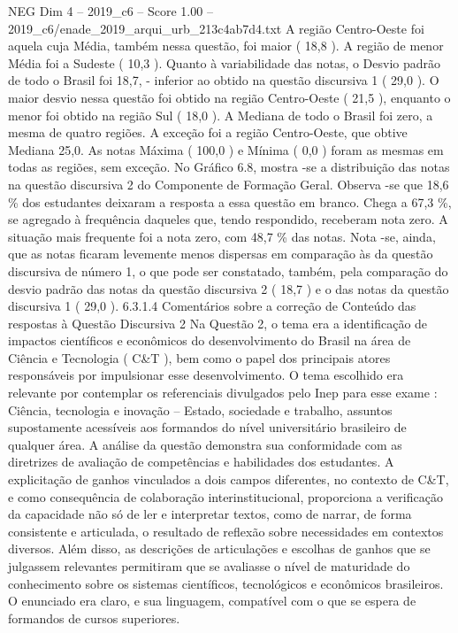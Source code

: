 \begin{textsample}{NEG Dim 4 – 2019\_c6 – Score 1.00 – 2019\_c6/enade\_2019\_arqui\_urb\_213c4ab7d4.txt}
A região Centro-Oeste foi aquela cuja Média, também nessa questão, foi maior ( 18,8 ).
A região de menor Média foi a Sudeste ( 10,3 ).
Quanto à variabilidade das notas, o Desvio padrão de todo o Brasil foi 18,7, - inferior ao obtido na questão discursiva 1 ( 29,0 ).
O maior desvio nessa questão foi obtido na região Centro-Oeste ( 21,5 ), enquanto o menor foi obtido na região Sul ( 18,0 ).
A Mediana de todo o Brasil foi zero, a mesma de quatro regiões.
A exceção foi a região Centro-Oeste, que obtive Mediana 25,0.
As notas Máxima ( 100,0 ) e Mínima ( 0,0 ) foram as mesmas em todas as regiões, sem exceção.
No Gráfico 6.8, mostra -se a distribuição das notas na questão discursiva 2 do Componente de Formação Geral.
Observa -se que 18,6 \% dos estudantes deixaram a resposta a essa questão em branco.
Chega a 67,3 \%, se agregado à frequência daqueles que, tendo respondido, receberam nota zero.
A situação mais frequente foi a nota zero, com 48,7 \% das notas.
Nota -se, ainda, que as notas ficaram levemente menos dispersas em comparação às da questão discursiva de número 1, o que pode ser constatado, também, pela comparação do desvio padrão das notas da questão discursiva 2 ( 18,7 ) e o das notas da questão discursiva 1 ( 29,0 ). 6.3.1.4 Comentários sobre a correção de Conteúdo das respostas à Questão Discursiva 2 Na Questão 2, o tema era a identificação de impactos científicos e econômicos do desenvolvimento do Brasil na área de Ciência e Tecnologia ( C\&T ), bem como o papel dos principais atores responsáveis por impulsionar esse desenvolvimento.
O tema escolhido era relevante por contemplar os referenciais divulgados pelo Inep para esse exame : Ciência, tecnologia e inovação – Estado, sociedade e trabalho, assuntos supostamente acessíveis aos formandos do nível universitário brasileiro de qualquer área.
A análise da questão demonstra sua conformidade com as diretrizes de avaliação de competências e habilidades dos estudantes.
A explicitação de ganhos vinculados a dois campos diferentes, no contexto de C\&T, e como consequência de colaboração interinstitucional, proporciona a verificação da capacidade não só de ler e interpretar textos, como de narrar, de forma consistente e articulada, o resultado de reflexão sobre necessidades em contextos diversos.
Além disso, as descrições de articulações e escolhas de ganhos que se julgassem relevantes permitiram que se avaliasse o nível de maturidade do conhecimento sobre os sistemas científicos, tecnológicos e econômicos brasileiros.
O enunciado era claro, e sua linguagem, compatível com o que se espera de formandos de cursos superiores.

\end{textsample}

